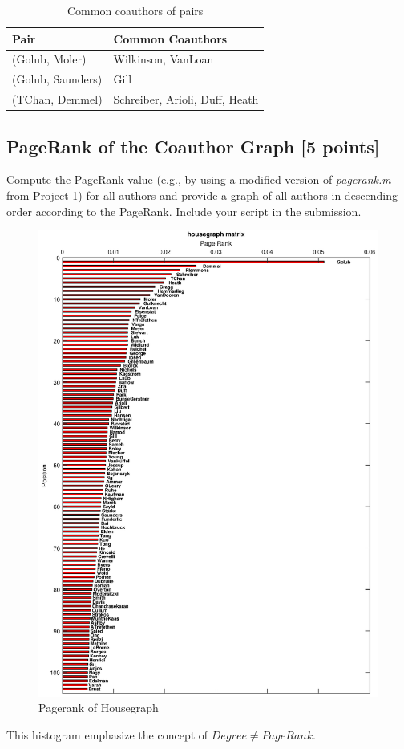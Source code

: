 \documentclass[unicode,11pt,a4paper,oneside,numbers=endperiod,openany]{scrartcl}
\begin{document}
\begin{table}[H]
    \centering
    \begin{tabular}{||l l||}
        \hline
        Pair              & Common Coauthors               \\ [0.5ex]
        \hline\hline
        (Golub, Moler)    & Wilkinson, VanLoan             \\
        (Golub, Saunders) & Gill                           \\
        (TChan, Demmel)   & Schreiber, Arioli, Duff, Heath \\[1ex]
        \hline
    \end{tabular}
    \caption{Common coauthors of pairs}
    \label{table:ex8_common_coauthors}
\end{table}

\cleardoublepage

\subsection{PageRank of the Coauthor Graph [5 points]}

Compute the PageRank value (e.g., by using a modified version of \textit{pagerank.m}
from Project 1) for all authors and provide a graph of all authors in descending order
according to the PageRank.
Include your script in the submission. \\

\begin{figure}[H]
    \includegraphics[width=2\textwidth, trim={5cm 0 0 0}]{figures/ex9_pagerank}
    \caption{Pagerank of Housegraph}
    \label{fig:ex9_pagerank}
\end{figure}

This histogram emphasize the concept of $Degree \neq PageRank$.
\end{document}
